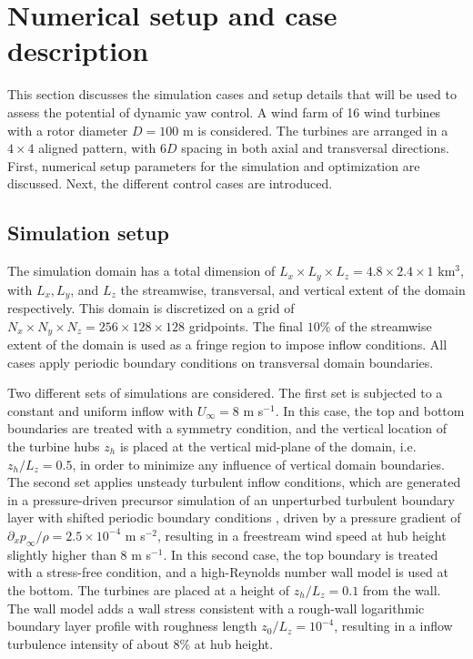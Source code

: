 \documentclass[energies,article,submit,moreauthors,latex,10pt,a4paper]{mdpi}
\newcommand{\revision}[1]{{\color{red} #1}}
\begin{document}
\section{Numerical setup and case description}\label{sec:opt_yaw_setup}
\noindent This section discusses the simulation cases and setup details that will be used to assess the potential of dynamic yaw control. A wind farm of 16 wind turbines with a rotor diameter $D = 100$ m is considered. The turbines are arranged in a $4 \times 4$ aligned pattern, with $6D$ spacing in both axial and transversal directions. First, numerical setup parameters for the simulation and optimization are discussed. Next, the different control cases are introduced. 

\subsection{Simulation setup}
\noindent The simulation domain has a \revision{total dimension of $L_x \times L_y \times L_z = 4.8 \times 2.4 \times 1 $ km$^3$, with $L_x, L_y$, and $L_z$ the streamwise, transversal, and vertical extent of the domain respectively. This domain is discretized on a grid of $N_x \times N_y \times N_z = 256 \times 128 \times 128$ gridpoints.} The final $10\%$ of the streamwise extent of the domain is used as a fringe region to impose inflow conditions. All cases apply periodic boundary conditions on transversal domain boundaries. 

Two different sets of simulations are considered. The first set is subjected to a \revision{constant} and uniform inflow with $U_\infty = 8$ m s$^{-1}$. In this case, the top and bottom boundaries are treated with a symmetry condition, \revision{and the vertical location of the turbine hubs $z_h$ is placed at the vertical mid-plane of the domain, i.e. $z_h/L_z = 0.5$,} in order to minimize any influence of vertical domain boundaries. The second set applies unsteady turbulent inflow conditions, which are generated in a pressure-driven precursor simulation of an unperturbed turbulent boundary layer with shifted periodic boundary conditions \cite{munters2016shifted}, driven by a pressure gradient of $\partial_x p_\infty/\rho = 2.5 \times 10^{-4}$ m s$^{-2}$, resulting in a freestream wind speed at hub height slightly higher than 8 m s$^{-1}$. In this second case, the top boundary is treated with a stress-free condition, and a high-Reynolds number wall model is used at the bottom. The turbines are placed at a height of $z_h/L_z = 0.1$ from the wall. The wall model adds a wall stress consistent with a rough-wall logarithmic boundary layer profile with roughness length $z_0/L_z = 10^{-4}$, resulting in a inflow turbulence intensity of about 8\% at hub height. 
\end{document}
